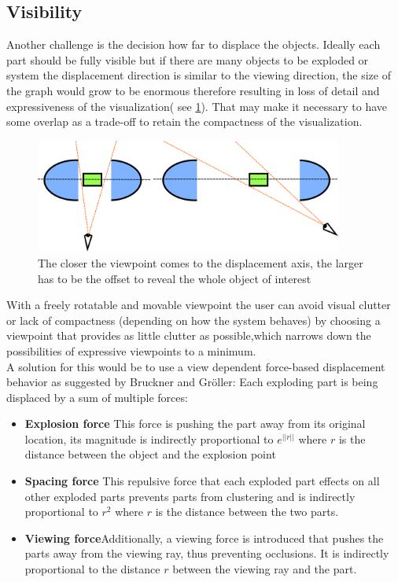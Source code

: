 \subsection{Visibility}
Another challenge is the decision how far to displace the objects. Ideally each part should be fully visible but if there are many objects to be exploded or system the displacement direction is similar to the viewing direction, the size of the graph would grow to be enormous therefore resulting in loss of detail and expressiveness of the visualization( see \ref{fig:perspective}). That may make it necessary to have some overlap as a trade-off to retain the compactness of the visualization.\\
\begin{figure}[tb]
	\centering
	\includegraphics[width=0.9\textwidth]{chapters/figures/perspective}
	\caption{The closer the viewpoint comes to the displacement axis, the larger has to be the offset to reveal the whole object of interest}
	\label{fig:perspective}
\end{figure}
With a freely rotatable and movable viewpoint the user can avoid visual clutter or lack of compactness (depending on how the system behaves) by choosing a viewpoint that provides as little clutter as possible,which narrows down the possibilities of expressive viewpoints to a minimum.\\
A solution for this would be to use a view dependent force-based displacement behavior as suggested by Bruckner and Gr\"oller\cite{proc:bruckner-2006-EVV}: Each exploding part is being displaced by a sum of multiple forces:
\begin{itemize}
\item \textbf{Explosion force} This force is pushing the part away from its original location, its magnitude is indirectly proportional to $e^{||r||}$ where $r$ is the distance between the object and the explosion point
\item \textbf{Spacing force} This repulsive force that each exploded part effects on all other exploded parts prevents parts from clustering and is indirectly proportional to $r^2$ where $r$ is the distance between the two parts.
\item \textbf{Viewing force}Additionally,  a viewing force is introduced that pushes the parts away from the viewing ray, thus preventing occlusions. It is indirectly proportional to the distance $r$ between the viewing ray and the part.
\end{itemize}
